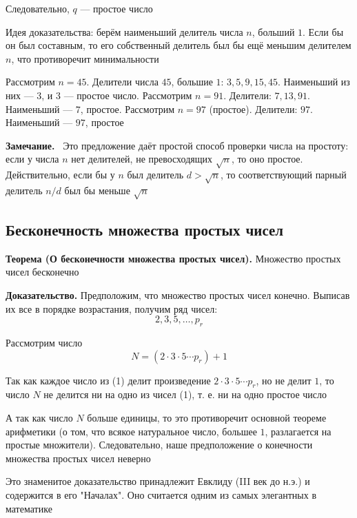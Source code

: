 \documentclass[a4paper,12pt]{article}
\newcommand{\myremark}{\textbf{Замечание.}\ }
\theoremstyle{definition}
\theoremstyle{plain}
\theoremstyle{remark}
\begin{document}
	Следовательно, $q$ — простое число
	
	\begin{tcolorbox}[colback=green!5, colframe=green!50!black, title=Пояснение]
		Идея доказательства: берём наименьший делитель числа $n$, больший $1$. Если бы он был составным, то его собственный делитель был бы ещё меньшим делителем $n$, что противоречит минимальности
	\end{tcolorbox}
	
	\begin{tcolorbox}[colback=gray!5, colframe=gray!50, title=Пример]
		Рассмотрим $n = 45$. Делители числа $45$, большие $1$: $3, 5, 9, 15, 45$. Наименьший из них — $3$, и $3$ — простое число.
		Рассмотрим $n = 91$. Делители: $7, 13, 91$. Наименьший — $7$, простое.
		Рассмотрим $n = 97$ (простое). Делители: $97$. Наименьший — $97$, простое
	\end{tcolorbox}
	
	\myremark
	Это предложение даёт простой способ проверки числа на простоту: если у числа $n$ нет делителей, не превосходящих $\sqrt{n}$, то оно простое. Действительно, если бы у $n$ был делитель $d > \sqrt{n}$, то соответствующий парный делитель $n/d$ был бы меньше $\sqrt{n}$
	
	\subsection{Бесконечность множества простых чисел}
	
	\noindent \textbf{Теорема (О бесконечности множества простых чисел).}
	Множество простых чисел бесконечно
	
	\medskip
	\noindent \textbf{Доказательство.}
	Предположим, что множество простых чисел конечно. Выписав их все в порядке возрастания, получим ряд чисел:
	\[
	2, 3, 5, \dots, p_r \tag{1}
	\]
	
	Рассмотрим число
	\[
	N = (2 \cdot 3 \cdot 5 \cdots p_r) + 1
	\]
	
	Так как каждое число из (1) делит произведение $2 \cdot 3 \cdot 5 \cdots p_r$, но не делит $1$, то число $N$ не делится ни на одно из чисел (1), т. е. ни на одно простое число
	
	А так как число $N$ больше единицы, то это противоречит основной теореме арифметики (о том, что всякое натуральное число, большее $1$, разлагается на простые множители). Следовательно, наше предположение о конечности множества простых чисел неверно
	
	\begin{tcolorbox}[colback=red!5, colframe=red!70!black, title=Классическое доказательство Евклида]
		Это знаменитое доказательство принадлежит Евклиду (III век до н.э.) и содержится в его "Началах". Оно считается одним из самых элегантных в математике
	\end{tcolorbox}
	
\end{document}
